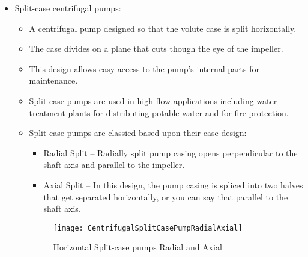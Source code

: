 \begin{enumerate}
\begin{itemize}
\begin{itemize}
\end{itemize}
\item Split-case centrifugal pumps:
\begin{itemize}
\item A centrifugal pump designed so that the volute case is split horizontally.
\item The case divides on a plane that cuts though the eye of the impeller.
\item This design allows easy access to the pump’s internal parts for maintenance.  
\item Split-case pumps are used in high flow applications including water treatment plants for distributing potable water and for fire protection.  
\item Split-case pumps are classied based upon their case design:
\begin{itemize}
\item Radial Split – Radially split pump casing opens perpendicular to the shaft axis and parallel to the impeller.     

\item Axial Split – In this design, the pump casing is spliced into two halves that get separated horizontally, or you can say that parallel to the shaft axis.
\end{itemize} 
\begin{figure}[h!]
\begin{center}
\texttt{[image: CentrifugalSplitCasePumpRadialAxial]}
\caption{Horizontal Split-case pumps Radial and Axial }
\end{center}
\end{figure}
\end{itemize}
\end{itemize}
\end{enumerate}
\newpage
